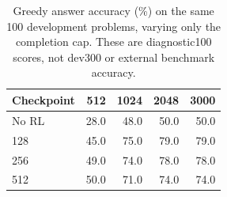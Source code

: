 \begin{table}[t]
\centering
\caption{Greedy answer accuracy (\%) on the same 100 development problems, varying only the completion cap. These are diagnostic100 scores, not dev300 or external benchmark accuracy.}
\label{tab:inference_budget}
\footnotesize
\setlength{\tabcolsep}{4pt}
\begin{tabular}{lrrrr}
\toprule
Checkpoint & 512 & 1024 & 2048 & 3000\\
\midrule
No RL & 28.0 & 48.0 & 50.0 & 50.0\\
128 & 45.0 & 75.0 & 79.0 & 79.0\\
256 & 49.0 & 74.0 & 78.0 & 78.0\\
512 & 50.0 & 71.0 & 74.0 & 74.0\\
\bottomrule
\end{tabular}
\end{table}
